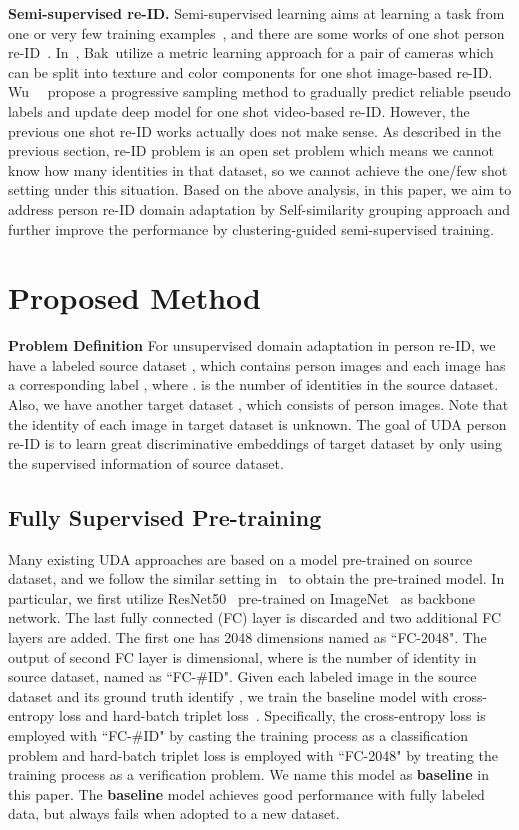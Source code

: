 \documentclass[10pt,twocolumn,letterpaper]{article}
\begin{document}
{\bf Semi-supervised re-ID.} Semi-supervised learning aims at learning a task from one or very few training examples~\cite{fei2006one}, and there are some works of one shot person re-ID~\cite{bak2017one,figueira2013semi,liu2014semi, wu2018exploit}. In~\cite{bak2017one}, Bak~\etal utilize a metric learning approach for a pair of cameras which can be split into texture and color components for one shot image-based re-ID. Wu~\etal~\cite{wu2018exploit} propose a progressive sampling method to gradually predict reliable pseudo labels and update deep model for one shot video-based re-ID. However, the previous one shot re-ID works actually does not make sense. As described in the previous section, re-ID problem is an open set problem which means we cannot know how many identities in that dataset, so we cannot achieve the one/few shot setting under this situation. Based on the above analysis, in this paper, we aim to address person re-ID domain adaptation by Self-similarity grouping approach and further improve the performance by clustering-guided semi-supervised training.


 \section{Proposed Method}
{\bf Problem Definition}
For unsupervised domain adaptation in person re-ID, we have a labeled source dataset , which contains  person images and each image  has a corresponding label , where .  is the number of identities in the source dataset. Also, we have another target dataset , which consists of  person images. Note that the identity of each image  in target dataset  is unknown. The goal of UDA person re-ID is to learn great discriminative embeddings of target dataset by only using the supervised information of source dataset.

\subsection{Fully Supervised Pre-training} \label{sec3.1}
Many existing UDA approaches are based on a model pre-trained on source dataset, and we follow the similar setting in~\cite{fu2019sta,zhong2017re,zhong2018generalizing,zhong2018camera} to obtain the pre-trained model. In particular, we first utilize ResNet50~\cite{he2016deep} pre-trained on ImageNet~\cite{deng2009imagenet} as backbone network. The last fully connected (FC) layer is discarded and two additional FC layers are added. The first one has 2048 dimensions named as ``FC-2048". The output of second FC layer is  dimensional, where  is the number of identity in source dataset, named as ``FC-\#ID". Given each labeled image  in the source dataset and its ground truth identify , we train the baseline model with cross-entropy loss and hard-batch triplet loss~\cite{hermans2017defense}. Specifically, the cross-entropy loss is employed with ``FC-\#ID" by casting the training process as a classiﬁcation problem and hard-batch triplet loss is employed with ``FC-2048" by treating the training process as a verification problem. We name this model as {\bf baseline} in this paper. The {\bf baseline} model achieves good performance with fully labeled data, but always fails when adopted to a new dataset. 
\end{document}
